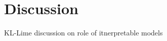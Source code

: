 \documentclass[main]{subfiles}
\begin{document}
\chapter{Discussion}









KL-Lime discussion on role of itnerpretable models
\end{document}
